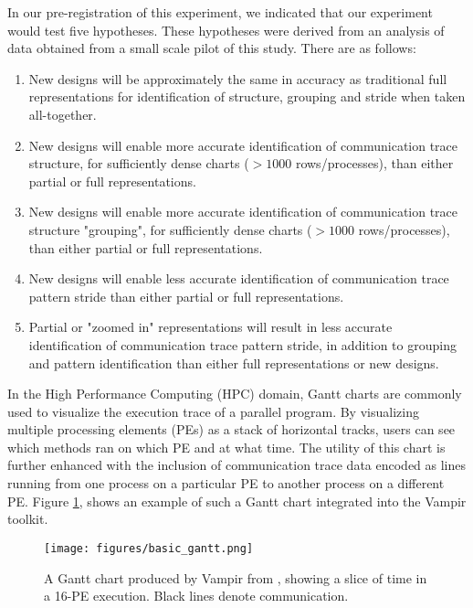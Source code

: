     In our pre-registration of this experiment, we indicated that our experiment would test five hypotheses. These hypotheses were derived from an analysis of data obtained from a small scale pilot of this study. There are as follows:
    
    
    \vspace{-.5em}
    \begin{enumerate}[start=1, label={\bfseries H\arabic*}]
        \itemsep-.2em
        \item New designs will be approximately the same in accuracy as traditional full representations for identification of structure, grouping and stride when taken all-together.
        \item New designs will enable more accurate identification of communication trace structure, for sufficiently dense charts ($>1000$ rows/processes), than either partial or full representations.
        \item New designs will enable more accurate identification of communication trace structure "grouping", for sufficiently dense charts ($>1000$ rows/processes), than either partial or full representations.
        \item New designs will enable less accurate identification of communication trace pattern stride than either partial or full representations.
        \item Partial or "zoomed in" representations will result in less accurate identification of communication trace pattern stride, in addition to grouping and pattern identification than either full representations or new designs.
    \end{enumerate}
    


In the High Performance Computing (HPC) domain, Gantt charts are commonly used to visualize the execution trace of a parallel program. By visualizing multiple processing elements (PEs) as a stack of horizontal tracks, users can see which methods ran on which PE and at what time. The utility of this chart is further enhanced with the inclusion of communication trace data encoded as lines running from one process on a particular PE to another process on a different PE. Figure \ref{fig:simple_gantt}, shows an example of such a Gantt chart integrated into the Vampir toolkit.


\begin{figure}
    \centering
    \texttt{[image: figures/basic\_gantt.png]}
    \caption{A Gantt chart produced by Vampir from \cite{isaacs2014state}, showing a slice of time in a 16-PE execution. Black lines denote communication.}
    \label{fig:simple_gantt}
\end{figure}

